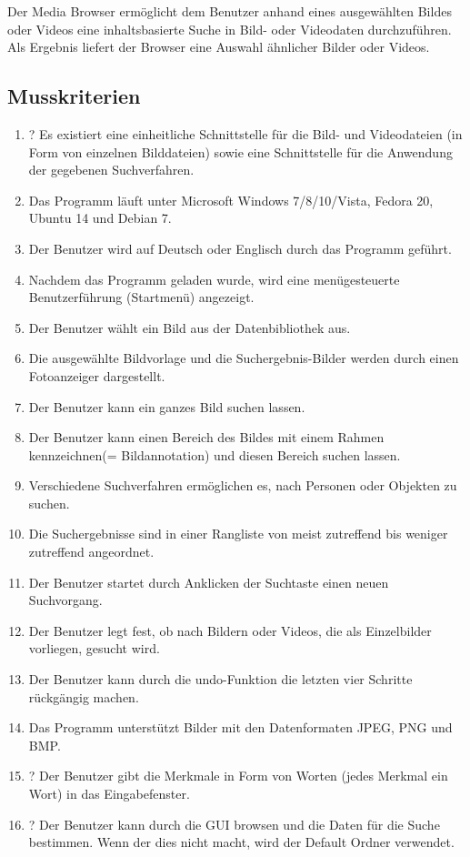 Der Media Browser ermöglicht dem Benutzer anhand eines ausgewählten Bildes oder Videos eine inhaltsbasierte Suche in Bild- oder Videodaten durchzuführen. Als Ergebnis liefert der Browser eine Auswahl ähnlicher Bilder oder Videos.
\subsection{Musskriterien}
\begin{enumerate} [label=\bfseries /MK \arabic*0/]
\item ? Es existiert eine einheitliche Schnittstelle für die Bild- und Videodateien (in Form von einzelnen Bilddateien) sowie eine Schnittstelle für die Anwendung der gegebenen Suchverfahren.
\item Das Programm läuft unter Microsoft Windows 7/8/10/Vista, Fedora 20, Ubuntu 14 und Debian 7.
\item Der Benutzer wird auf Deutsch oder Englisch durch das Programm geführt.
\item Nachdem das Programm geladen wurde, wird eine menügesteuerte Benutzerführung (Startmenü) angezeigt.
\item Der Benutzer wählt ein Bild aus der Datenbibliothek aus.
\item Die ausgewählte Bildvorlage und die Suchergebnis-Bilder werden durch einen Fotoanzeiger dargestellt.
\item Der Benutzer kann ein ganzes Bild suchen lassen.
\item Der Benutzer kann einen Bereich des Bildes mit einem Rahmen kennzeichnen(= Bildannotation) und diesen Bereich suchen lassen.
\item Verschiedene Suchverfahren ermöglichen es, nach Personen oder Objekten zu suchen.
\item Die Suchergebnisse sind in einer Rangliste von meist zutreffend bis weniger zutreffend angeordnet.
\item Der Benutzer startet durch Anklicken der Suchtaste einen neuen Suchvorgang.
\item Der Benutzer legt fest, ob nach Bildern oder Videos, die als Einzelbilder vorliegen, gesucht wird.
\item Der Benutzer kann durch die undo-Funktion die letzten vier Schritte rückgängig machen.
\item Das Programm unterstützt Bilder mit den Datenformaten JPEG, PNG und BMP.
\item ? Der Benutzer gibt die Merkmale in Form von Worten (jedes Merkmal ein Wort) in das Eingabefenster.
\item ? Der Benutzer kann durch die GUI browsen und die Daten für die Suche bestimmen. Wenn der dies nicht macht, wird der Default Ordner verwendet.

\end{enumerate}

